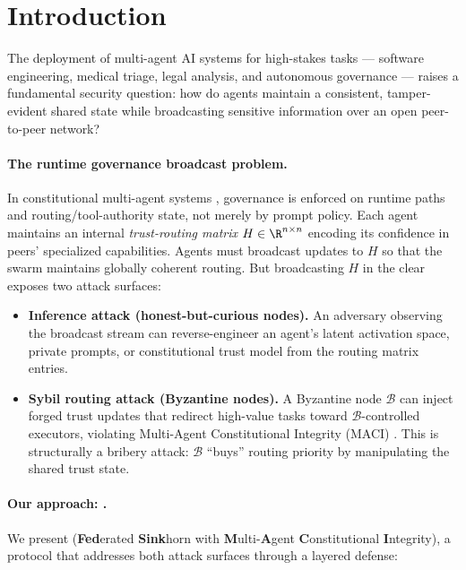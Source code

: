 \section{Introduction}
\label{sec:introduction}

The deployment of multi-agent AI systems for high-stakes tasks —
software engineering, medical triage, legal analysis, and autonomous governance — raises
a fundamental security question: how do agents maintain a consistent, tamper-evident
shared state while broadcasting sensitive information over an open peer-to-peer network?

\paragraph{The runtime governance broadcast problem.}
In constitutional multi-agent systems \cite{bai2022constitutional,acgs2025}, governance
is enforced on runtime paths and routing/tool-authority state, not merely by prompt
policy.  Each agent
maintains an internal \emph{trust-routing matrix} $H \in \R^{n \times n}$ encoding its
confidence in peers' specialized capabilities.  Agents must broadcast updates to $H$
so that the swarm maintains globally coherent routing.  But broadcasting $H$ in the
clear exposes two attack surfaces:

\begin{itemize}
  \item \textbf{Inference attack (honest-but-curious nodes).}  An adversary observing
    the broadcast stream can reverse-engineer an agent's latent activation space,
    private prompts, or constitutional trust model from the routing matrix entries.

  \item \textbf{Sybil routing attack (Byzantine nodes).}  A Byzantine node $\mathcal{B}$
    can inject forged trust updates that redirect high-value tasks toward
    $\mathcal{B}$-controlled executors, violating Multi-Agent Constitutional Integrity
    (MACI) \cite{maci_spec}.  This is structurally a bribery attack: $\mathcal{B}$
    ``buys'' routing priority by manipulating the shared trust state.
\end{itemize}

\paragraph{Our approach: \fedsink{}.}
We present \fedsink{} (\textbf{Fed}erated \textbf{Sink}horn with \textbf{M}ulti-\textbf{A}gent
\textbf{C}onstitutional \textbf{I}ntegrity), a protocol that addresses both attack surfaces
through a layered defense:


